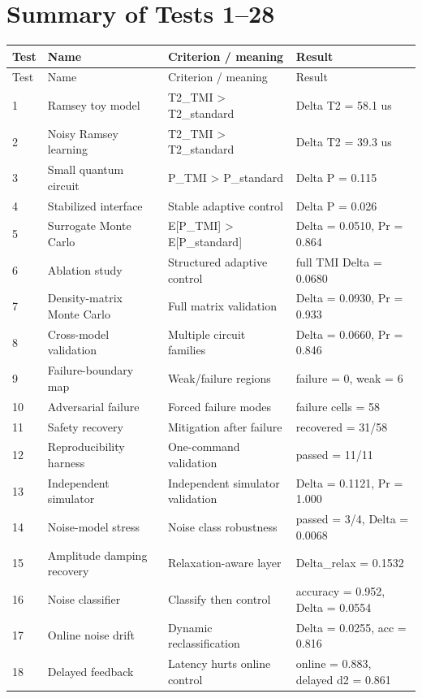 \documentclass[12pt,a4paper]{article}
\begin{document}
\section{Summary of Tests 1--28}
\begin{longtable}{p{0.9cm}p{4.0cm}p{5.0cm}p{5.4cm}}
\toprule
Test & Name & Criterion / meaning & Result \\
\midrule
\endfirsthead
\toprule
Test & Name & Criterion / meaning & Result \\
\midrule
\endhead
1 & Ramsey toy model & T2\_TMI > T2\_standard & Delta T2 = 58.1 us \\
2 & Noisy Ramsey learning & T2\_TMI > T2\_standard & Delta T2 = 39.3 us \\
3 & Small quantum circuit & P\_TMI > P\_standard & Delta P = 0.115 \\
4 & Stabilized interface & Stable adaptive control & Delta P = 0.026 \\
5 & Surrogate Monte Carlo & E[P\_TMI] > E[P\_standard] & Delta = 0.0510, Pr = 0.864 \\
6 & Ablation study & Structured adaptive control & full TMI Delta = 0.0680 \\
7 & Density-matrix Monte Carlo & Full matrix validation & Delta = 0.0930, Pr = 0.933 \\
8 & Cross-model validation & Multiple circuit families & Delta = 0.0660, Pr = 0.846 \\
9 & Failure-boundary map & Weak/failure regions & failure = 0, weak = 6 \\
10 & Adversarial failure & Forced failure modes & failure cells = 58 \\
11 & Safety recovery & Mitigation after failure & recovered = 31/58 \\
12 & Reproducibility harness & One-command validation & passed = 11/11 \\
13 & Independent simulator & Independent simulator validation & Delta = 0.1121, Pr = 1.000 \\
14 & Noise-model stress & Noise class robustness & passed = 3/4, Delta = 0.0068 \\
15 & Amplitude damping recovery & Relaxation-aware layer & Delta\_relax = 0.1532 \\
16 & Noise classifier & Classify then control & accuracy = 0.952, Delta = 0.0554 \\
17 & Online noise drift & Dynamic reclassification & Delta = 0.0255, acc = 0.816 \\
18 & Delayed feedback & Latency hurts online control & online = 0.883, delayed d2 = 0.861 \\

\end{longtable}
\end{document}
